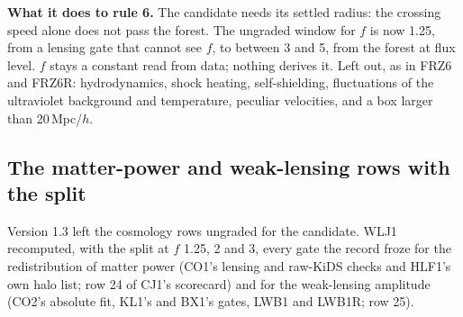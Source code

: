 \documentclass[10pt]{article}
\begin{document}
\textbf{What it does to rule 6.} The candidate needs its settled radius: the crossing speed alone does not pass the forest. The ungraded window for $f$ is now 1.25, from a lensing gate that cannot see $f$, to between 3 and 5, from the forest at flux level. $f$ stays a constant read from data; nothing derives it. Left out, as in FRZ6 and FRZ6R: hydrodynamics, shock heating, self-shielding, fluctuations of the ultraviolet background and temperature, peculiar velocities, and a box larger than 20\,Mpc/$h$.

\subsection{The matter-power and weak-lensing rows with the split}
Version 1.3 left the cosmology rows ungraded for the candidate. WLJ1 recomputed, with the split at $f$ 1.25, 2 and 3, every gate the record froze for the redistribution of matter power (CO1's lensing and raw-KiDS checks and HLF1's own halo list; row 24 of CJ1's scorecard) and for the weak-lensing amplitude (CO2's absolute fit, KL1's and BX1's gates, LWB1 and LWB1R; row 25).
\end{document}
